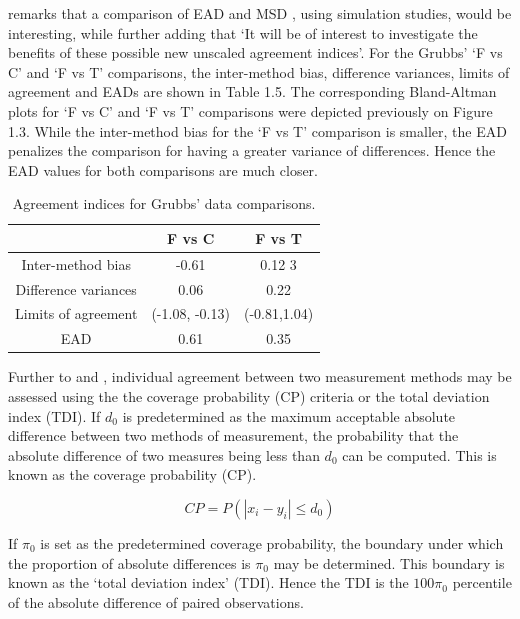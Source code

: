 \documentclass[12pt, a4paper]{report}
\theoremstyle{plain}
\theoremstyle{definition}
\theoremstyle{remark}
\begin{document}
	\citet{Barnhart} remarks that a comparison of EAD and MSD , using
	simulation studies, would be interesting, while further adding
	that `It will be of interest to investigate the benefits of these
	possible new unscaled agreement indices'. For the Grubbs' `F vs C' and `F vs T' comparisons, the inter-method bias, difference variances, limits of agreement and EADs are shown
	in Table 1.5. The corresponding Bland-Altman plots for `F vs C' and `F vs T' comparisons were depicted previously on Figure 1.3. While the inter-method bias for the `F vs T' comparison is smaller, the EAD penalizes the comparison for having a greater variance of differences. Hence the EAD values for both comparisons are much closer.
	\begin{table}[ht]
		\begin{center}
			\begin{tabular}{|c|c|c|}
				\hline
				& F vs C & F vs T  \\
				\hline
				Inter-method bias & -0.61 & 0.12 3 \\
				Difference variances & 0.06 & 0.22  \\
				Limits of agreement & (-1.08,	-0.13) & (-0.81,1.04) \\
				EAD & 0.61 & 0.35  \\
				\hline
			\end{tabular}
			\caption{Agreement indices for Grubbs' data comparisons.}
		\end{center}
	\end{table}
	
	Further to  \citet{lin2000} and \citet{lin2002}, individual agreement between two measurement methods may be
	assessed using the the coverage probability (CP) criteria or the total deviation index (TDI). If $d_{0}$ is predetermined as the maximum acceptable absolute difference between two methods of measurement, the probability that the absolute difference of two measures being less than $d_{0}$ can be computed. This is known as the coverage probability (CP).
	
	\begin{equation}
	CP = P(|x_{i} - y_{i}| \leq d_{0})
	\end{equation}
	
	If $\pi_{0}$ is set as the predetermined coverage probability, the
	boundary under which the proportion of absolute differences is
	$\pi_{0}$ may be determined. This boundary is known as the `total
	deviation index' (TDI). Hence the TDI is the $100\pi_{0}$
	percentile of the absolute difference of paired observations.
	
\end{document}
